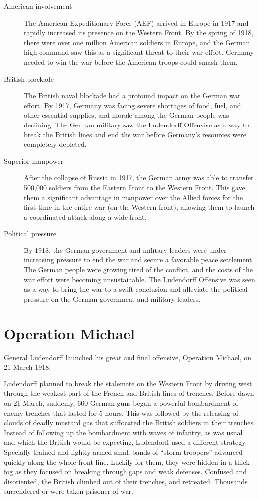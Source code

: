 \documentclass[a4paper,numbers=endperiod,most,twoside,english,final,openany]{scrbook} %
\begin{document}
\begin{description}
    	\item[American involvement]
The American Expeditionary Force (AEF) arrived in Europe in 1917 and rapidly increased its presence on the Western Front. By the spring of 1918, there were over one million American soldiers in Europe, and the German high command saw this as a significant threat to their war effort. Germany needed to win the war before the American troops could smash them.
	\item[British blockade]
The British naval blockade had a profound impact on the German war effort. By 1917, Germany was facing severe shortages of food, fuel, and other essential supplies, and morale among the German people was declining. The German military saw the Ludendorff Offensive as a way to break the British lines and end the war before Germany's resources were completely depleted.
	\item[Superior manpower]
After the collapse of Russia in 1917, the German army was able to transfer 500,000 soldiers from the Eastern Front to the Western Front. This gave them a significant advantage in manpower over the Allied forces for the first time in the entire war (on the Western front), allowing them to launch a coordinated attack along a wide front.
	\item[Political pressure]
By 1918, the German government and military leaders were under increasing pressure to end the war and secure a favorable peace settlement. The German people were growing tired of the conflict, and the costs of the war effort were becoming unsustainable. The Ludendorff Offensive was seen as a way to bring the war to a swift conclusion and alleviate the political pressure on the German government and military leaders.
\end{description}

\section{Operation Michael}

General Ludendorff launched his great and final offensive, Operation Michael, on 21 March 1918.

Ludendorff planned to break the stalemate on the Western Front by driving west through the weakest part of the French and British lines of trenches. Before dawn on 21 March, suddenly, 600 German guns began a powerful bombardment of enemy trenches that lasted for 5 hours. This was followed by the releasing of clouds of deadly mustard gas that suffocated the British soldiers in their trenches. Instead of following up the bombardment with waves of infantry, as was usual and which the British would be expecting, Ludendorff used a different strategy. Specially trained and lightly armed small bands of ``storm troopers'' advanced quickly along the whole front line. Luckily for them, they were hidden in a thick fog as they focused on breaking through gaps and weak defenses. Confused and disoriented, the British climbed out of their trenches, and retreated. Thousands surrendered or were taken prisoner of war.
\end{document}
